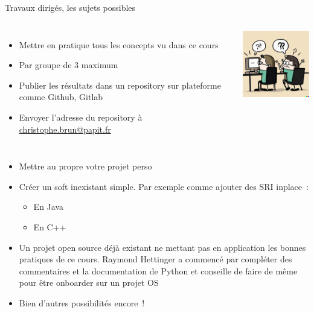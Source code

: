 \documentclass{beamer}
\begin{document}
    \begin{frame}{Travaux dirigés, les sujets possibles}

        \begin{columns}
            \begin{itemize}

                \item Mettre en pratique tous les concepts vu dans ce cours
                \item Par groupe de 3 maximum
                \item Publier les résultats dans un repository sur plateforme comme Github, Gitlab
                \item Envoyer l'adresse du repository à \url{christophe.brun@papit.fr}

            \end{itemize}

            \centering
            \includegraphics[width=4cm]{image/working-together}
        \end{columns}

        \begin{itemize}

            \item Mettre au propre votre projet perso
            \item Créer un soft inexistant simple.
            Par exemple comme ajouter des SRI inplace~:
            \begin{itemize}
                \item En Java
                \item En C++
            \end{itemize}
            \item Un projet open source déjà existant ne mettant pas en application les bonnes pratiques de ce cours.
            Raymond Hettinger a commencé par compléter des commentaires et la documentation de Python et conseille de faire de même pour être onboarder sur un projet OS
            \item Bien d'autres possibilités encore~!

        \end{itemize}

    \end{frame}
\end{document}
